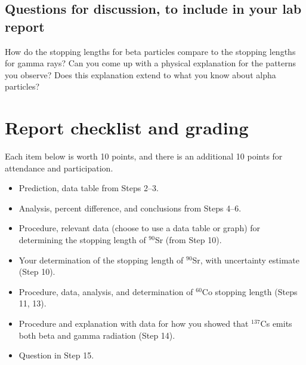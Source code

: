 \subsection{Questions for discussion, to include in your lab report}

\begin{steps}

	\item How do the stopping lengths for beta particles compare to the stopping lengths for gamma rays? Can you come up with a physical explanation for the patterns you observe? Does this explanation extend to what you know about alpha particles?
	
\end{steps}

\section{Report checklist and grading}

Each item below is worth 10 points, and there is an additional 10 points for attendance and participation.

\begin{itemize}
	\item Prediction, data table from Steps 2--3.
	
	\item Analysis, percent difference, and conclusions from Steps 4--6.
	
	\item Procedure, relevant data (choose to use a data table or graph) for determining the stopping length of $^90$Sr (from Step 10).
	
	\item Your determination of the stopping length of $^90$Sr, with uncertainty estimate (Step 10).
	
	\item Procedure, data, analysis, and determination of $^60$Co stopping length (Steps 11, 13).
	
	\item Procedure and explanation with data for how you showed that $^137$Cs emits both beta and gamma radiation (Step 14).
	
	\item Question in Step 15.
\end{itemize}